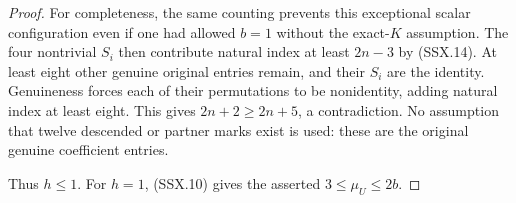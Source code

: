 \begin{proof}
For completeness, the same counting prevents this exceptional
scalar configuration even if one had allowed $b=1$ without the
exact-$K$ assumption.  The four nontrivial $S_i$ then contribute
natural index at least $2n-3$ by (SSX.14).  At least eight other
genuine original entries remain, and their $S_i$ are the identity.
Genuineness forces each of their permutations to be nonidentity,
adding natural index at least eight.  This gives
$2n+2\ge2n+5$, a contradiction.  No assumption that twelve
descended or partner marks exist is used: these are the original
genuine coefficient entries.

Thus $h\le1$.  For $h=1$, (SSX.10) gives the asserted
$3\le\mu_U\le2b$.
\end{proof}
